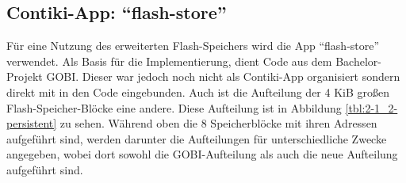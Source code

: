 \subsection{Contiki-App: "`flash-store"'}

Für eine Nutzung des erweiterten Flash-Speichers wird die App "`flash-store"' verwendet. Als Basis für die Implementierung, dient Code aus dem Bachelor-Projekt
GOBI. Dieser war jedoch noch nicht als Contiki-App organisiert sondern direkt mit in den Code eingebunden. Auch ist die Aufteilung der 4 KiB großen
Flash-Speicher-Blöcke eine andere. Diese Aufteilung ist in Abbildung \ref{tbl:2-1_2-persistent} zu sehen. Während oben die 8 Speicherblöcke mit ihren Adressen
aufgeführt sind, werden darunter die Aufteilungen für unterschiedliche Zwecke angegeben, wobei dort sowohl die GOBI-Aufteilung als auch die neue
Aufteilung aufgeführt sind.


